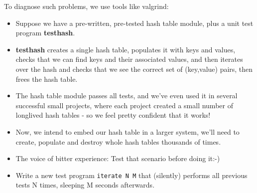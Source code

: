 \documentclass[handout]{beamer}
\newcommand{\pitem}{\pause \item}
\begin{document}
\begin{frame}[fragile]
    To diagnose such problems, we use tools like \alert{valgrind}:
    \begin{itemize}
    \item
      Suppose we have a \alert{pre-written, pre-tested}
      hash table module, plus a unit test program {\bf testhash}.
    \pitem
      {\bf testhash} creates a single hash table, populates it with keys and values,
      checks that we can find keys and their associated values, and
      then iterates over the hash and checks that we see the correct
      set of (key,value) pairs, then frees the hash table.
    \pitem
      The hash table module \alert{passes all tests}, and
      we've even used it in several successful small projects,
      where each project created a small number of \alert{longlived} hash tables
      - so we feel pretty confident that it works!
    \pitem
      Now, we intend to embed our hash table in a larger system,
      we'll need to create, populate and destroy whole hash tables
      \alert{thousands of times}.
    \pitem
      The voice of bitter experience: \alert{Test that scenario} before doing it:-)
    \pause
    \item
      Write a new test program \verb+iterate N M+ that (silently)
      performs all previous tests N times, sleeping M seconds afterwards.
    \end{itemize}
\end{frame}
\end{document}
